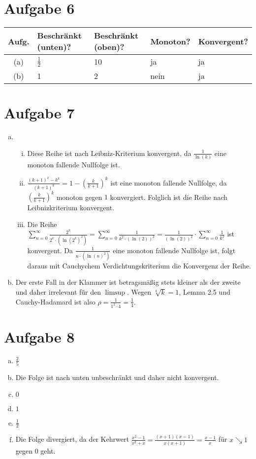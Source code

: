 \documentclass{article}
\begin{document}
    \section*{Aufgabe 6}
    \begin{tabular}{c|l|l|l|l}
        Aufg.&Beschränkt (unten)?& Beschränkt (oben)?&Monoton? & Konvergent?\\
        \hline
        (a) & $\frac{1}{2}$ & 10& ja& ja\\
        (b) & 1&2&nein& ja
    \end{tabular}
    \section*{Aufgabe 7}
    \begin{enumerate}[(a)]
        \item \begin{enumerate}[(i)]
            \item Diese Reihe ist nach Leibniz-Kriterium konvergent, da $\frac{1}{\ln(k)}$ eine monoton fallende Nullfolge ist.
            \item $\frac{(k+1)^k-k^k}{(k+1)^k} = 1 - \left(\frac{k}{k+1}\right)^k$ ist eine monoton fallende Nullfolge, da  $\left(\frac{k}{k+1}\right)^k$ monoton gegen $1$ konvergiert. Folglich ist die Reihe nach Leibnizkriterium konvergent.
            \item Die Reihe $\sum_{n = 0}^{\infty}\frac{2^k}{2^k\cdot (\ln(2^k)^2)} = \sum_{n = 0}^{\infty}\frac{1}{k^2\cdot (\ln(2))^2} = \frac{1}{(\ln(2))^2} \cdot \sum_{n = 0}^{\infty}\frac{1}{k^2}$ ist konvergent.
            Da $\frac{1}{n\cdot (\ln(n)^2)}$ eine monoton fallende Nullfolge ist, folgt daraus mit Cauchychem Verdichtungskriterium die Konvergenz der Reihe.
        \end{enumerate}
        \item Der erste Fall in der Klammer ist betragsmäßig stets kleiner als der zweite und daher irrelevant für den $\limsup$. Wegen $\sqrt[k]{k} = 1$, Lemma 2.5 und Cauchy-Hadamard ist also $\rho = \frac{1}{1^2\cdot 4} = \frac{1}{4}$.
    \end{enumerate}
    \section*{Aufgabe 8}
    \begin{enumerate}[(a)]
        \item $\frac{2}{5}$
        \item Die Folge ist nach unten unbeschränkt und daher nicht konvergent.
        \item $0$
        \item $1$
        \item $\frac{1}{2}$
        \item Die Folge divergiert, da der Kehrwert $\frac{x^2-1}{x^2+x} = \frac{(x+1)(x-1)}{x(x+1)} = \frac{x-1}{x}$ für $x \searrow 1$ gegen 0 geht.
    \end{enumerate}
\end{document}
